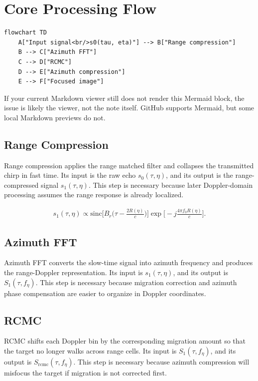 \documentclass[journal,onecolumn]{IEEEtran}
\begin{document}
\section{Core Processing Flow}
\begin{lstlisting}
flowchart TD
    A["Input signal<br/>s0(tau, eta)"] --> B["Range compression"]
    B --> C["Azimuth FFT"]
    C --> D["RCMC"]
    D --> E["Azimuth compression"]
    E --> F["Focused image"]
\end{lstlisting}
If your current Markdown viewer still does not render this Mermaid block, the issue is likely the viewer, not the note itself. GitHub supports Mermaid, but some local Markdown previews do not.

\subsection{Range Compression}
Range compression applies the range matched filter and collapses the transmitted chirp in fast time. Its input is the raw echo $s_0(\tau,\eta)$, and its output is the range-compressed signal $s_1(\tau,\eta)$. This step is necessary because later Doppler-domain processing assumes the range response is already localized.

\begin{align}
s_1(\tau,\eta)\propto \mathrm{sinc}\biggl[ B_r \biggl( \tau-\frac{2R(\eta)}{c} \biggr) \biggr] \exp \biggl[ -j\frac{4\pi f_0R(\eta)}{c} \biggr].
\end{align}
\subsection{Azimuth FFT}
Azimuth FFT converts the slow-time signal into azimuth frequency and produces the range-Doppler representation. Its input is $s_1(\tau,\eta)$, and its output is $S_1(\tau,f_\eta)$. This step is necessary because migration correction and azimuth phase compensation are easier to organize in Doppler coordinates.

\subsection{RCMC}
RCMC shifts each Doppler bin by the corresponding migration amount so that the target no longer walks across range cells. Its input is $S_1(\tau,f_\eta)$, and its output is $S_{\mathrm{rcmc}}(\tau,f_\eta)$. This step is necessary because azimuth compression will misfocus the target if migration is not corrected first.
\end{document}
